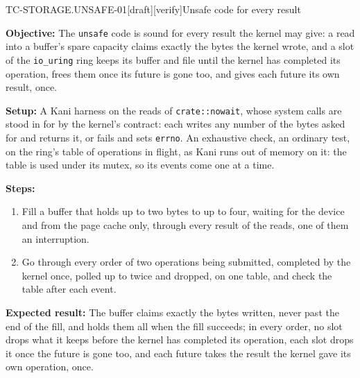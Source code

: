 \begin{requirement}{TC-STORAGE.UNSAFE-01}[draft][verify]{Unsafe code for every result}


  \textbf{Objective:} The \texttt{unsafe} code is sound for every result
  the kernel may give: a read into a buffer's spare capacity claims exactly
  the bytes the kernel wrote, and a slot of the \texttt{io\_uring} ring keeps
  its buffer and file until the kernel has completed its operation, frees
  them once its future is gone too, and gives each future its own result,
  once.

  \textbf{Setup:} A Kani harness on the reads of \texttt{crate::nowait},
  whose system calls are stood in for by the kernel's contract: each writes
  any number of the bytes asked for and returns it, or fails and sets
  \texttt{errno}. An exhaustive check, an ordinary test, on the ring's table
  of operations in flight, as Kani runs out of memory on it: the table is
  used under its mutex, so its events come one at a time.

  \textbf{Steps:}
  \begin{enumerate}
    \item Fill a buffer that holds up to two bytes to up to four, waiting for
      the device and from the page cache only, through every result of the
      reads, one of them an interruption.
    \item Go through every order of two operations being submitted,
      completed by the kernel once, polled up to twice and dropped, on one
      table, and check the table after each event.
  \end{enumerate}

  \textbf{Expected result:} The buffer claims exactly the bytes written,
  never past the end of the fill, and holds them all when the fill
  succeeds; in every order, no slot drops what it keeps before the kernel
  has completed its operation, each slot drops it once the future is gone
  too, and each future takes the result the kernel gave its own operation,
  once.



\end{requirement}

